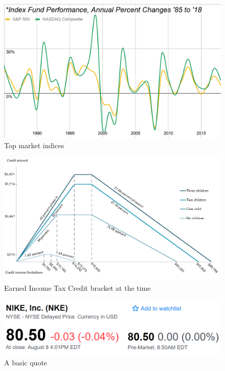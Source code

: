 \documentclass{article}
\begin{document}
\vspace{10pt}

\begin{figure}[!htb]
    \centering
    \includegraphics[width=\textwidth]{imgs/3.png}
    \caption{Top market indices}
\end{figure}

\vspace{10pt}

\begin{figure}[!htb]
    \centering
    \includegraphics[width=\textwidth]{imgs/4.png}
    \caption{Earned Income Tax Credit bracket at the time}
\end{figure}

\vspace{10pt}

\begin{figure}[!htb]
    \centering
    \includegraphics[width=\textwidth]{imgs/5.png}
    \caption{A basic quote}
\end{figure}
\end{document}
